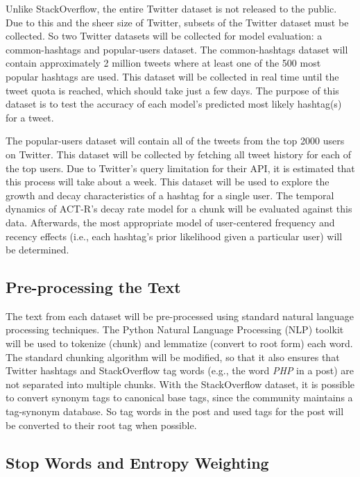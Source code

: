 \documentclass[man,floatsintext,donotrepeattitle]{apa6}
\begin{document}
Unlike StackOverflow, the entire Twitter dataset is not released to the public.
Due to this and the sheer size of Twitter, subsets of the Twitter dataset must be collected.
So two Twitter datasets will be collected for model evaluation: a common-hashtags and popular-users dataset.
The common-hashtags dataset will contain approximately 2 million tweets where at least one of the 500 most popular hashtags are used.
This dataset will be collected in real time until the tweet quota is reached, which should take just a few days.
The purpose of this dataset is to test the accuracy of each model's predicted most likely hashtag(s) for a tweet.

The popular-users dataset will contain all of the tweets from the top \num{2000} users on Twitter.
This dataset will be collected by fetching all tweet history for each of the top users.
Due to Twitter's query limitation for their API, it is estimated that this process will take about a week.
This dataset will be used to explore the growth and decay characteristics of a hashtag for a single user.
The temporal dynamics of ACT-R's decay rate model for a chunk will be evaluated against this data.
Afterwards, the most appropriate model of user-centered frequency and recency effects (i.e., each hashtag's prior likelihood given a particular user) will be determined.

\subsection{Pre-processing the Text}

The text from each dataset will be pre-processed using standard natural language processing techniques.
The Python Natural Language Processing (NLP) toolkit \parencite{Bird2009} will be used to tokenize (chunk) and lemmatize (convert to root form) each word.
The standard chunking algorithm will be modified, so that it also ensures that Twitter hashtags and StackOverflow tag words (e.g., the word \emph{PHP} in a post) are not separated into multiple chunks.
With the StackOverflow dataset, it is possible to convert synonym tags to canonical base tags, since the community maintains a tag-synonym database.
So tag words in the post and used tags for the post will be converted to their root tag when possible.

\subsection{Stop Words and Entropy Weighting}
\end{document}
